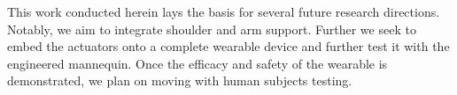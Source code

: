 \documentclass[letterpaper, 10pt, conference]{ieeeconf}      %
\begin{document}
This work conducted herein lays the basis for several future research directions. Notably, we aim to integrate shoulder and arm support. Further we seek to embed the actuators onto a complete wearable device and further test it with the engineered mannequin. Once the efficacy and safety of the wearable is demonstrated, we plan on moving with human subjects testing. %




\end{document}

